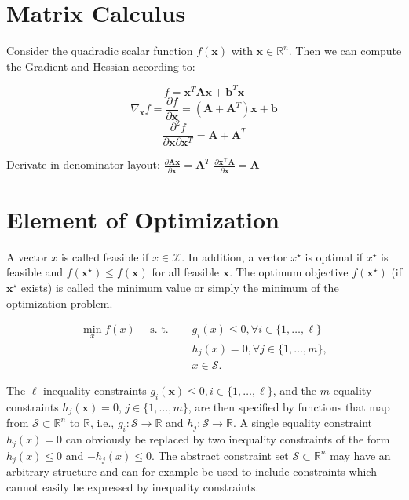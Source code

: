 \documentclass[english]{latex4ei_sheet}
\begin{document}
\section{Matrix Calculus}
\begin{sectionbox}
	Consider the quadradic scalar function $f(\mathbf{x})$ with $\mathbf{x} \in \mathbb{R}^n$. Then we can compute the Gradient and Hessian according to:
	
\begin{emphbox}
$$
f =\mathbf{x}^{T} \mathbf{A} \mathbf{x}+\mathbf{b}^{T} \mathbf{x} 	
$$
$$
\nabla_{\mathbf{x}} f=\frac{\partial f}{\partial \mathbf{x}}=\left(\mathbf{A}+\mathbf{A}^{T}\right) \mathbf{x}+\mathbf{b}
$$
$$
\frac{\partial^{2} f}{\partial \mathbf{x} \partial \mathbf{x}^{T}} =\mathbf{A}+\mathbf{A}^{T}
$$
\end{emphbox}
Derivate in denominator layout:
$\frac{\partial \mathbf{A} \mathbf{x}}{\partial \mathbf{x}}=\mathbf{A}^T$
$\frac{\partial \mathbf{x}^{\top} \mathbf{A}}{\partial \mathbf{x}}=\mathbf{A}$
\end{sectionbox}
\section{Element of Optimization}
\begin{sectionbox}
A vector $x$ is called feasible if $x \in \mathcal{X} .$ In addition, a vector $x^{\star}$ is optimal if $x^{\star}$ is feasible and $f\left(\boldsymbol{x}^{\star}\right) \leq f(\boldsymbol{x})$ for all feasible $\boldsymbol{x}$. The optimum objective $f\left(\boldsymbol{x}^{\star}\right)$ (if $\boldsymbol{x}^{\star}$ exists) is called the minimum value or simply the minimum of the optimization problem.
\begin{emphbox}
$$
\begin{aligned}
	\min _{x} f(x) \quad \text { s. t. } \quad & g_{i}(x) \leq 0, \forall i \in\{1, \ldots, \ell\} \\
	& h_{j}(x)=0, \forall j \in\{1, \ldots, m\}, \\
	& x \in \mathcal{S} .
\end{aligned}
$$

\end{emphbox}
The $\ell$ inequality constraints $g_{i}(\boldsymbol{x}) \leq 0, i \in\{1, \ldots, \ell\}$, and the $m$ equality constraints $h_{j}(\boldsymbol{x})=0$, $j \in\{1, \ldots, m\}$, are then specified by functions that map from $\mathcal{S} \subset \mathbb{R}^{n}$ to $\mathbb{R}$, i.e., $g_{i}: \mathcal{S} \rightarrow \mathbb{R}$ and $h_{j}: \mathcal{S} \rightarrow \mathbb{R}$. A single equality constraint $h_{j}(x)=0$ can obviously be replaced by two inequality constraints of the form $h_{j}(x) \leq 0$ and $-h_{j}(x) \leq 0$. The abstract constraint set $\mathcal{S} \subset \mathbb{R}^{n}$ may have an arbitrary structure and can for example be used to include constraints which cannot easily be expressed by inequality constraints.
\end{sectionbox}
\end{document}
